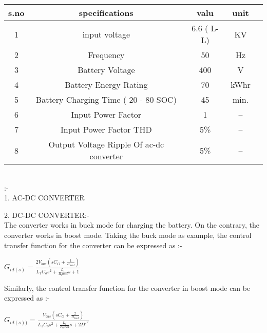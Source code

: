 \documentclass{article} %
\begin{document}
\begin{tabular}{|c|c|c|c|c|} 
\hline
s.no & specifications & valu & unit \\[0.5ex]
\hline
1 & input voltage & 6.6 ( L-L) & KV\\
\hline
2 & Frequency & 50 &  Hz \\
\hline 
3 & Battery Voltage & 400 & V \\
\hline
4 & Battery Energy Rating &  70 & kWhr \\
\hline
5 & Battery Charging Time ( 20 - 80 SOC) & 45 & min.  \\
\hline
6 & Input Power Factor & 1 & -- \\ 
\hline 
7 & Input Power Factor THD & 5\% & -- \\
\hline
8 & Output Voltage Ripple Of ac-dc converter & 5\% & -- \\
\hline

\end{tabular} \\


\Large{}:-\\

      1. AC-DC CONVERTER 
    
  2. DC-DC CONVERTER:- \\
   
     The converter works in buck mode for charging the
battery. On the contrary, the converter works in boost mode.
Taking the buck mode as example, the control transfer
function for the converter can be expressed as :- \\

\begin{center}

$ G_{id(s)}= \frac{2V_{bus}(sC_O + \frac{1}{R_{load}})}{L_1 C_{o }{s^{2}}+\frac{L_1}{R_load}s +1}$ \\
\end{center}

Similarly, the control transfer function for the converter
in boost mode can be expressed as :-\\

\begin{center}


$G_{id(s))} = \frac{V_{bus}(sC_O + \frac{2}{R_{load}})}{L_1 C_{o }{s^{2}}+\frac{L_1}{R_load}s +2D'^{2}}$ \\

\end{center}
\end{document}
